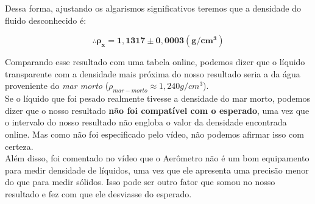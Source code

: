 Dessa forma, ajustando os algarismos significativos teremos que a densidade do fluido desconhecido é:

\[ \mathbf{\therefore \rho _x = 1,1317 \pm 0,0003 (g/cm^3)} \]

Comparando esse resultado com uma tabela online, podemos dizer que o líquido transparente com a densidade mais próxima do nosso resultado seria a da água proveniente do \textit{mar morto} ($\rho _{mar-morto} \approx 1,240 g/cm^3$).\\

Se o líquido que foi pesado realmente tivesse a densidade do mar morto, podemos dizer que o nosso resultado \textbf{não foi compatível com o esperado}, uma vez que o intervalo do nosso resultado não engloba o valor da densidade encontrada online. Mas como não foi especificado pelo vídeo, não podemos afirmar isso com certeza.\\

Além disso, foi comentado no vídeo que o Aerômetro não é um bom equipamento para medir densidade de líquidos, uma vez que ele apresenta uma precisão menor do que para medir sólidos. Isso pode ser outro fator que somou no nosso resultado e fez com que ele desviasse do esperado.



